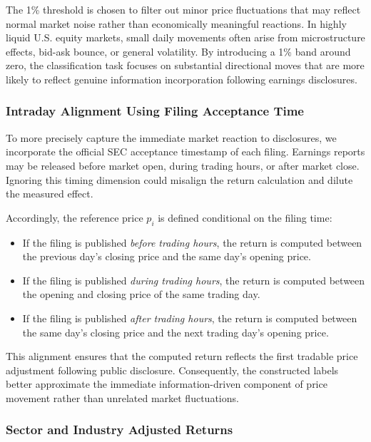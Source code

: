 The 1\% threshold is chosen to filter out minor price fluctuations that may reflect normal market noise rather than economically meaningful reactions. In highly liquid U.S. equity markets, small daily movements often arise from microstructure effects, bid-ask bounce, or general volatility. By introducing a 1\% band around zero, the classification task focuses on substantial directional moves that are more likely to reflect genuine information incorporation following earnings disclosures.

\subsubsection*{Intraday Alignment Using Filing Acceptance Time}

To more precisely capture the immediate market reaction to disclosures, we incorporate the official SEC acceptance timestamp of each filing. Earnings reports may be released before market open, during trading hours, or after market close. Ignoring this timing dimension could misalign the return calculation and dilute the measured effect.

Accordingly, the reference price $p_i$ is defined conditional on the filing time:

\begin{itemize}
    \item If the filing is published \textit{before trading hours}, the return is computed between the previous day's closing price and the same day's opening price.
    \item If the filing is published \textit{during trading hours}, the return is computed between the opening and closing price of the same trading day.
    \item If the filing is published \textit{after trading hours}, the return is computed between the same day's closing price and the next trading day's opening price.
\end{itemize}

This alignment ensures that the computed return reflects the first tradable price adjustment following public disclosure. Consequently, the constructed labels better approximate the immediate information-driven component of price movement rather than unrelated market fluctuations.

\subsubsection*{Sector and Industry Adjusted Returns}

